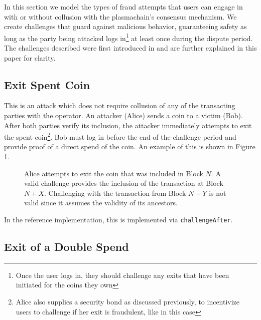 
In this section we model the types of fraud attempts that users can engage in with or without collusion with the plasmachain's consensus mechanism. We create challenges that guard against malicious behavior, guaranteeing safety as long as the party being attacked logs in\footnote{Once the user logs in, they should challenge any exits that have been initiated for the coins they own} at least once during the dispute period. The challenges described were first introduced in \cite{plasma_cash, plasma_cash_simple_spec} and are further explained in this
paper for clarity.

\subsection{Exit Spent Coin} \label{exit_spent_coin}

This is an attack which does not require collusion of any of the transacting
parties with the operator. An attacker (Alice) sends a coin to a victim (Bob). 
After both parties verify its inclusion, the attacker immediately attempts to exit the spent coin\footnote{Alice also supplies a security bond as discussed previously, to incentivize users to challenge if her exit is fraudulent, like in this case}. Bob must log in before the end of the challenge period and provide proof of a direct spend of the coin. An example of this is shown in Figure \ref{fig:challenge_after}.

\begin{figure}[H]
	\caption{
        Alice attempts to exit the coin that was included in Block $N$. A
        valid challenge provides the inclusion of the transaction at Block
        $N+X$. Challenging with the transaction from Block $N+Y$ is not valid
        since it assumes the validity of its ancestors.
	}
    \label{fig:challenge_after}
\end{figure}

In the reference implementation, this is implemented via
\texttt{challengeAfter}.

\subsection{Exit of a Double Spend}

